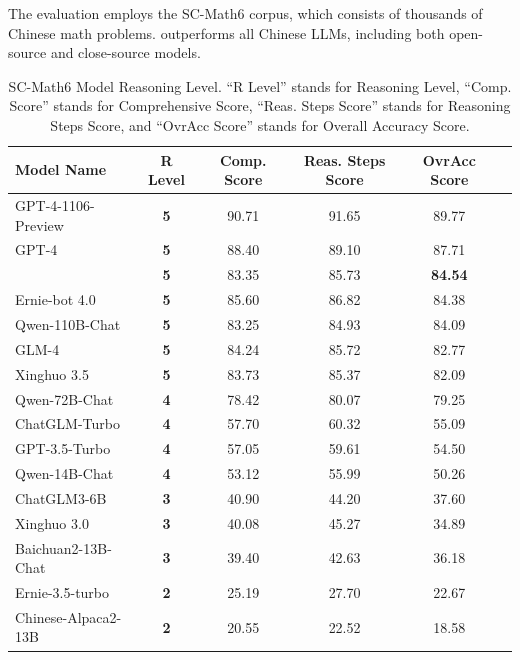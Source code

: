 
The evaluation employs the SC-Math6 corpus, which consists of thousands of Chinese math problems. 
\dsviirl{} outperforms all Chinese LLMs, including both open-source and close-source models. 

\begin{table}[!ht]
    \centering
    \begin{tabular}{lccccc}
    \toprule
    \centering
    \textbf{Model Name} & \textbf{R Level} & \textbf{Comp. Score} & \textbf{Reas. Steps Score} & \textbf{OvrAcc Score} \\
    \midrule
    GPT-4-1106-Preview & \textbf{5} & 90.71 & 91.65 & 89.77 \\
    GPT-4 & \textbf{5} & 88.40 & 89.10 & 87.71 \\ \midrule
    \dsviirl{} & \textbf{5} & 83.35 & 85.73 & \textbf{84.54} \\
    Ernie-bot 4.0 & \textbf{5} & 85.60 & 86.82 & 84.38 \\
    Qwen-110B-Chat & \textbf{5} & 83.25 & 84.93 & 84.09 \\
    GLM-4 & \textbf{5} & 84.24 & 85.72 & 82.77 \\
    Xinghuo 3.5 & \textbf{5} & 83.73 & 85.37 & 82.09 \\
    Qwen-72B-Chat & \textbf{4} &78.42 & 80.07 & 79.25 \\
    ChatGLM-Turbo & \textbf{4} & 57.70 & 60.32 & 55.09 \\
    GPT-3.5-Turbo & \textbf{4} & 57.05 & 59.61 & 54.50 \\
    Qwen-14B-Chat & \textbf{4} & 53.12 & 55.99 & 50.26 \\
    ChatGLM3-6B & \textbf{3} & 40.90 & 44.20 & 37.60 \\
    Xinghuo 3.0 & \textbf{3} & 40.08 & 45.27 & 34.89 \\
    Baichuan2-13B-Chat & \textbf{3} & 39.40 & 42.63 & 36.18 \\
    Ernie-3.5-turbo & \textbf{2} & 25.19 & 27.70 & 22.67 \\
    Chinese-Alpaca2-13B & \textbf{2} & 20.55 & 22.52 & 18.58 \\
    \bottomrule
    \end{tabular}
    \caption{
    SC-Math6 Model Reasoning Level. 
    ``R Level'' stands for Reasoning Level, 
    ``Comp. Score'' stands for Comprehensive Score, 
    ``Reas. Steps Score'' stands for Reasoning Steps Score, 
    and ``OvrAcc Score'' stands for Overall Accuracy Score.
    }
    \label{tab:model_overall}
\end{table}

